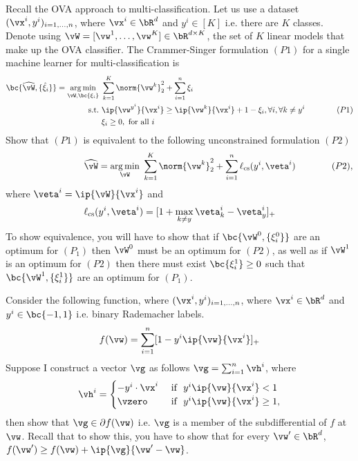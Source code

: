 \begin{mlproblem}{15}
Recall the OVA approach to multi-classification. Let us use a dataset $(\vx^i,y^i)_{i=1,\ldots,n}$, where $\vx^i \in \bR^d$ and $y^i \in [K]$ i.e. there are $K$ classes. Denote using $\vW = [\vw^1,\ldots,\vw^K] \in \bR^{d \times K}$, the set of $K$ linear models that make up the OVA classifier. The Crammer-Singer formulation $(P1)$ for a single machine learner for multi-classification is
\begin{align*}
\bc{\widehat\vW, \{\hat\xi_i\}} = \underset{\vW,\bc{\xi_i}}{\arg\min}&\ \sum_{k=1}^K\norm{\vw^k}_2^2 + \sum_{i=1}^n\xi_i\\
\text{s.t.} &\ \ip{\vw^{y^i}}{\vx^i} \geq \ip{\vw^k}{\vx^i} + 1 - \xi_i, \forall i, \forall k \neq y^i\qquad\qquad{(P1)}\\
&\ \xi_i \geq 0, \text{ for all } i
\end{align*}
Show that $(P1)$ is equivalent to the following unconstrained formulation $(P2)$
	\[
	\phantom{\hspace{20ex}}\widehat\vW = \underset{\vW}{\arg\min}\ \sum_{k=1}^K\norm{\vw^k}_2^2 + \sum_{i=1}^n\ell_\text{cs}(y^i,\veta^i)\qquad\qquad{(P2)},
	\]
	where $\veta^i = \ip{\vW}{\vx^i}$ and
	\[
	\ell_\text{cs}(y^i,\veta^i) = [1 + \max_{k \neq y}\veta^i_k - \veta^i_y]_+
	\]
	To show equivalence, you will have to show that if $\bc{\vW^0, \{\xi^0_i\}}$ are an optimum for $(P_1)$ then $\vW^0$ must be an optimum for $(P2)$, as well as if $\vW^1$ is an optimum for $(P2)$ then there must exist $\bc{\xi^1_i} \geq 0$ such that $\bc{\vW^1, \{\xi^1_i\}}$ are an optimum for $(P_1)$.
\end{mlproblem}

\begin{mlproblem}{5}
Consider the following function, where $(\vx^i,y^i)_{i=1,\ldots,n}$, where $\vx^i \in \bR^d$ and $y^i \in \bc{-1,1}$ i.e. binary Rademacher labels.
\[
f(\vw) = \sum_{i=1}^n[1 - y^i\ip{\vw}{\vx^i}]_+
\]
Suppose I construct a vector $\vg$ as follows $\vg = \sum_{i=1}^n\vh^i$, where
\[
\vh^i = \begin{cases}
-y^i\cdot\vx^i &\text{ if }\ y^i\ip{\vw}{\vx^i} < 1\\
\vzero &\text{ if }\ y^i\ip{\vw}{\vx^i} \geq 1,
\end{cases}
\]
then show that $\vg \in \partial f(\vw)$ i.e. $\vg$ is a member of the subdifferential of $f$ at $\vw$. Recall that to show this, you have to show that for every $\vw' \in \bR^d$, $f(\vw') \geq f(\vw) + \ip{\vg}{\vw'-\vw}$.
\end{mlproblem}